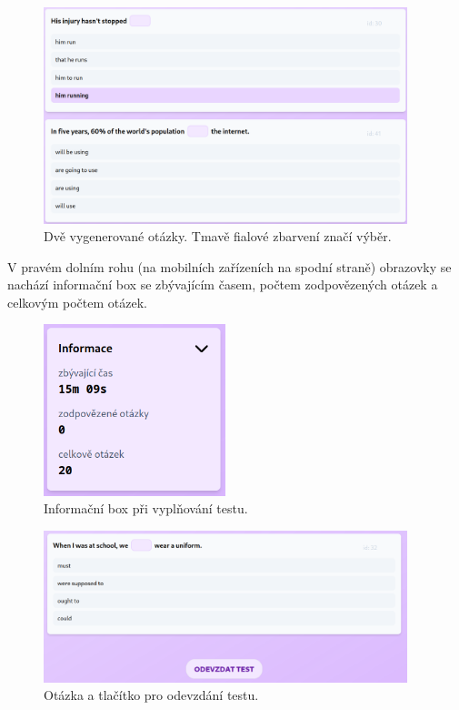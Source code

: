 \begin{figure}[H]
    \centering
    \includegraphics[width=400px]{images/01design/otazky.png}
    \caption{Dvě vygenerované otázky. Tmavě fialové zbarvení značí výběr.}
    \label{purplerect}
\end{figure}

V pravém dolním rohu (na mobilních zařízeních na spodní straně) obrazovky se nachází informační box se zbývajícím časem, počtem zodpovězených otázek a celkovým počtem otázek.

\begin{figure}[H]
    \centering
    \includegraphics[width=200px]{images/01design/infobox.png}
    \caption{Informační box při vyplňování testu.}
\end{figure}

\begin{figure}[H]
    \centering
    \includegraphics[width=400px]{images/01design/submit.png}
    \caption{Otázka a tlačítko pro odevzdání testu.}
\end{figure}

